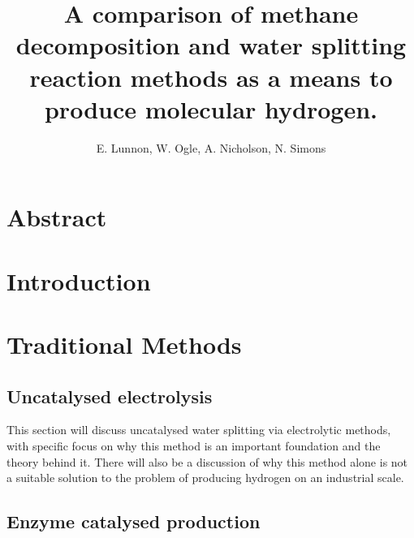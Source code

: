 \documentclass[a4paper]{article}
\title{A comparison of methane decomposition and water splitting reaction methods as a means to produce molecular hydrogen.}
\author{E. Lunnon, W. Ogle, A. Nicholson, N. Simons}
\begin{document}
\maketitle
\tableofcontents
\newpage


\section*{Abstract}%
\label{sec:abstract}
\clearpage


\section{Introduction}%
\label{sec:introduction}



\clearpage

\section{Traditional Methods}%
\label{sub:Traditional_Methods}





\subsection{Uncatalysed electrolysis}%
\label{sub:Uncatalysed_electrolysis}

This section will discuss uncatalysed water splitting via electrolytic methods, with specific focus on why this method is an important foundation and the theory behind it.
There will also be a discussion of why this method alone is not a suitable solution to the problem of producing hydrogen on an industrial scale.

\subsection{Enzyme catalysed production}%
\label{sub:enzyme_catalysed_production}
\end{document}
